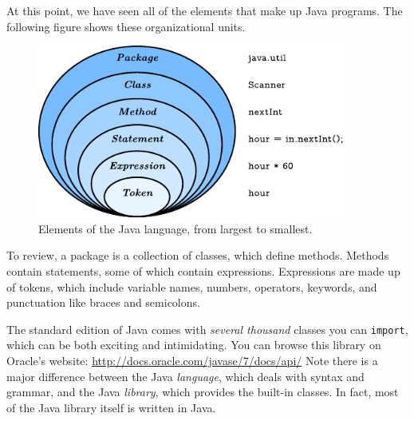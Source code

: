 \documentclass[12pt]{book}
\theoremstyle{exercise}
\newcommand{\java}[1]{\verb"#1"}
\newcommand{\java}[1]{\lstinline{#1}} %
\begin{document}
At this point, we have seen all of the elements that make up Java programs.
The following figure shows these organizational units.

\begin{figure}[!h]
\begin{center}
\includegraphics[width=4in]{figs/package.pdf}
\caption{Elements of the Java language, from largest to smallest.}
\end{center}
\end{figure}

To review, a package is a collection of classes, which define methods.
Methods contain statements, some of which contain expressions.
Expressions are made up of tokens, which include variable names, numbers, operators, keywords, and punctuation like braces and semicolons.

The standard edition of Java comes with {\em several thousand} classes you can \java{import}, which can be both exciting and intimidating.
You can browse this library on Oracle's website: \url{http://docs.oracle.com/javase/7/docs/api/}
Note there is a major difference between the Java {\em language}, which deals with syntax and grammar, and the Java {\em library}, which provides the built-in classes.
In fact, most of the Java library itself is written in Java.




\end{document}
